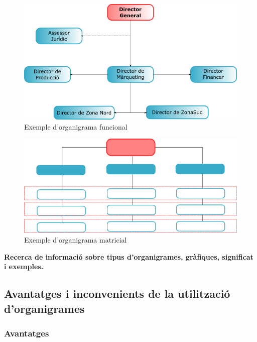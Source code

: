\documentclass[
  openany]{book}
\begin{document}
\begin{figure}

{\centering \includegraphics[width=0.8\linewidth]{organigrama} 

}

\caption{Exemple d'organigrama funcional}\label{fig:unnamed-chunk-1}
\end{figure}

\vspace{3cm}

\begin{figure}

{\centering \includegraphics[width=0.8\linewidth]{matricial} 

}

\caption{Exemple d'organigrama matricial}\label{fig:unnamed-chunk-2}
\end{figure}

\textbf{Recerca de informació sobre tipus d'organigrames, gràfiques, significat i exemples.}

\hypertarget{avantatges-i-inconvenients-de-la-utilitzaciuxf3-dorganigrames}{%
\subsection{Avantatges i inconvenients de la utilització d'organigrames}\label{avantatges-i-inconvenients-de-la-utilitzaciuxf3-dorganigrames}}

\hypertarget{avantatges}{%
\subsubsection{Avantatges}\label{avantatges}}
\end{document}

